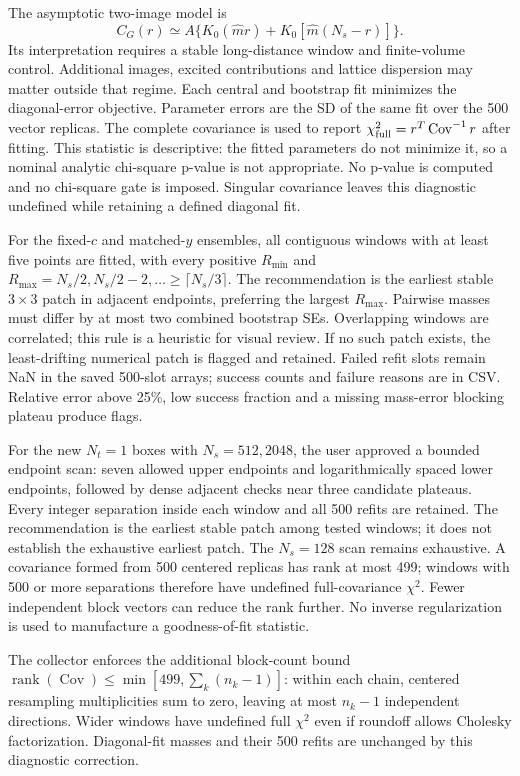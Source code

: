 \documentclass[11pt,a4paper]{article}
\begin{document}
The asymptotic two-image model is \cite[Eq.~(4.14)]{nebbia}
\[
 C_G(r)\simeq A\{K_0(\widehat m r)+K_0[\widehat m(N_s-r)]\}.
\]
Its interpretation requires a stable long-distance window and finite-volume
control. Additional images, excited contributions and lattice dispersion
may matter outside that regime. Each central and bootstrap fit minimizes
the diagonal-error objective. Parameter errors are the SD of the same fit
over the 500 vector replicas. The complete covariance is used to report
$\chi^2_{\rm full}=r^T\operatorname{Cov}^{-1}r$ after fitting.
This statistic is descriptive: the fitted parameters do not minimize it,
so a nominal analytic chi-square p-value is not appropriate. No p-value is
computed and no chi-square gate is imposed. Singular covariance leaves this
diagnostic undefined while retaining a defined diagonal fit.

For the fixed-$c$ and matched-$y$ ensembles, all contiguous windows with at least five points are fitted, with every
positive $R_{\min}$ and $R_{\max}=N_s/2,N_s/2-2,\ldots\geq\lceil N_s/3\rceil$.
The recommendation is the earliest stable $3\times3$ patch in adjacent
endpoints, preferring the largest $R_{\max}$. Pairwise masses must differ
by at most two combined bootstrap SEs. Overlapping windows are correlated;
this rule is a heuristic for visual review. If no such patch exists, the
least-drifting numerical patch is flagged and retained. Failed refit slots
remain NaN in the saved 500-slot arrays; success counts and failure reasons
are in CSV. Relative error above 25\%, low success fraction and a missing
mass-error blocking plateau produce flags.

For the new $N_t=1$ boxes with $N_s=512,2048$, the user approved a bounded
endpoint scan: seven allowed upper endpoints and logarithmically spaced
lower endpoints, followed by dense adjacent checks near three candidate
plateaus. Every integer separation inside each window and all 500 refits
are retained. The recommendation is the earliest stable patch among tested
windows; it does not establish the exhaustive earliest patch. The $N_s=128$
scan remains exhaustive. A covariance formed from 500 centered replicas
has rank at most 499; windows with 500 or more separations therefore have
undefined full-covariance $\chi^2$. Fewer independent block vectors can
reduce the rank further. No inverse regularization is used to manufacture
a goodness-of-fit statistic.

The collector enforces the additional block-count bound
$\operatorname{rank}(\operatorname{Cov})\leq\min[499,\sum_k(n_k-1)]$:
within each chain, centered resampling multiplicities sum to zero, leaving
at most $n_k-1$ independent directions. Wider windows have undefined full
$\chi^2$ even if roundoff allows Cholesky factorization. Diagonal-fit masses
and their 500 refits are unchanged by this diagnostic correction.
\end{document}
